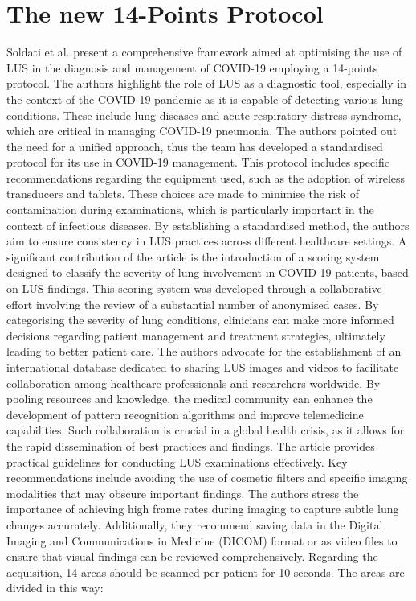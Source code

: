 \section{The new 14-Points Protocol}
Soldati et al. \cite{soldati2020proposal} present a comprehensive framework aimed at optimising the use of LUS in the diagnosis and management of COVID-19 employing a 14-points protocol. The authors highlight the  role of LUS as a diagnostic tool, especially in the context of the COVID-19 pandemic as it is capable of detecting various lung conditions. These include lung diseases and acute respiratory distress syndrome, which are critical in managing COVID-19 pneumonia.
The authors pointed out the need for a unified approach, thus the team has developed a standardised protocol for its use in COVID-19 management.
This protocol includes specific recommendations regarding the equipment used, such as the adoption of wireless transducers and tablets.
These choices are made to minimise the risk of contamination during examinations, which is particularly important in the context of infectious diseases. 
By establishing a standardised method, the authors aim to ensure consistency in LUS practices across different healthcare settings.
 A significant contribution of the article is the introduction of a scoring system designed to classify the severity of lung involvement in COVID-19 patients, based on LUS findings. This scoring system was developed through a collaborative effort involving the review of a substantial number of anonymised cases. By categorising the severity of lung conditions, clinicians can make more informed decisions regarding patient management and treatment strategies, ultimately leading to better patient care.
The authors advocate for the establishment of an international database dedicated to sharing LUS images and videos to facilitate collaboration among healthcare professionals and researchers worldwide. By pooling resources and knowledge, the medical community can enhance the development of pattern recognition algorithms and improve telemedicine capabilities. Such collaboration is crucial in a global health crisis, as it allows for the rapid dissemination of best practices and findings. The article provides practical guidelines for conducting LUS examinations effectively. Key recommendations include avoiding the use of cosmetic filters and specific imaging modalities that may obscure important findings. The authors stress the importance of achieving high frame rates during imaging to capture subtle lung changes accurately. Additionally, they recommend saving data in the Digital Imaging and Communications in Medicine (DICOM) format or as video files to ensure that visual findings can be reviewed comprehensively. Regarding the acquisition, 14 areas should be scanned per patient for 10 seconds. The areas are divided in this way:
